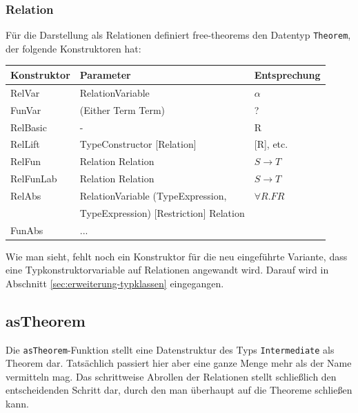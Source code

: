 \subsubsection{Relation}

Für die Darstellung als Relationen definiert free-theorems den Datentyp \texttt{Theorem}, der folgende Konstruktoren hat:


\begin{tabular}{| l | l | l |}
\hline
Konstruktor & Parameter & Entsprechung \\
\hline
RelVar & RelationVariable & $\alpha$ \\
FunVar & (Either Term Term) & ? \\
RelBasic & - & R \\
RelLift & TypeConstructor [Relation] & [R], etc. \\
RelFun & Relation Relation & $S \rightarrow T$ \\
RelFunLab & Relation Relation & $S \rightarrow T$ \\
RelAbs & RelationVariable (TypeExpression,  & $\forall R . F R$ \\
& TypeExpression) [Restriction] Relation & \\
FunAbs & ... & \\
\hline
\end{tabular}

Wie man sieht, fehlt noch ein Konstruktor für die neu eingeführte Variante, dass eine Typkonstruktorvariable auf Relationen
angewandt wird. Darauf wird in Abschnitt \ref{sec:erweiterung-typklassen} eingegangen.


\subsection{asTheorem}

Die \texttt{asTheorem}-Funktion stellt eine Datenstruktur des Typs \texttt{Intermediate} als Theorem dar. Tatsächlich passiert hier aber eine ganze Menge mehr als der Name
vermitteln mag. Das schrittweise Abrollen der Relationen stellt schließlich den entscheidenden Schritt dar, durch den man überhaupt auf
die Theoreme schließen kann.

